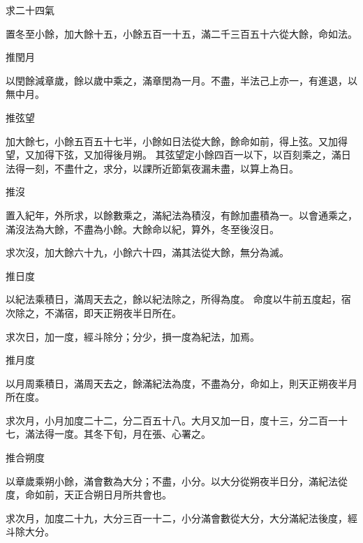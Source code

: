 \begin{pinyinscope}
 求二十四氣



 置冬至小餘，加大餘十五，小餘五百一十五，滿二千三百五十六從大餘，命如法。



 推閏月



 以閏餘減章歲，餘以歲中乘之，滿章閏為一月。不盡，半法己上亦一，有進退，以無中月。



 推弦望



 加大餘七，小餘五百五十七半，小餘如日法從大餘，餘命如前，得上弦。又加得望，又加得下弦，又加得後月朔。
 其弦望定小餘四百一以下，以百刻乘之，滿日法得一刻，不盡什之，求分，以課所近節氣夜漏未盡，以算上為日。



 推沒



 置入紀年，外所求，以餘數乘之，滿紀法為積沒，有餘加盡積為一。以會通乘之，滿沒法為大餘，不盡為小餘。大餘命以紀，算外，冬至後沒日。



 求次沒，加大餘六十九，小餘六十四，滿其法從大餘，無分為滅。



 推日度



 以紀法乘積日，滿周天去之，餘以紀法除之，所得為度。
 命度以牛前五度起，宿次除之，不滿宿，即天正朔夜半日所在。



 求次日，加一度，經斗除分；分少，損一度為紀法，加焉。



 推月度



 以月周乘積日，滿周天去之，餘滿紀法為度，不盡為分，命如上，則天正朔夜半月所在度。



 求次月，小月加度二十二，分二百五十八。大月又加一日，度十三，分二百一十七，滿法得一度。其冬下旬，月在張、心署之。



 推合朔度



 以章歲乘朔小餘，滿會數為大分；不盡，小分。以大分從朔夜半日分，滿紀法從度，命如前，天正合朔日月所共會也。



 求次月，加度二十九，大分三百一十二，小分滿會數從大分，大分滿紀法後度，經斗除大分。




\end{pinyinscope}
